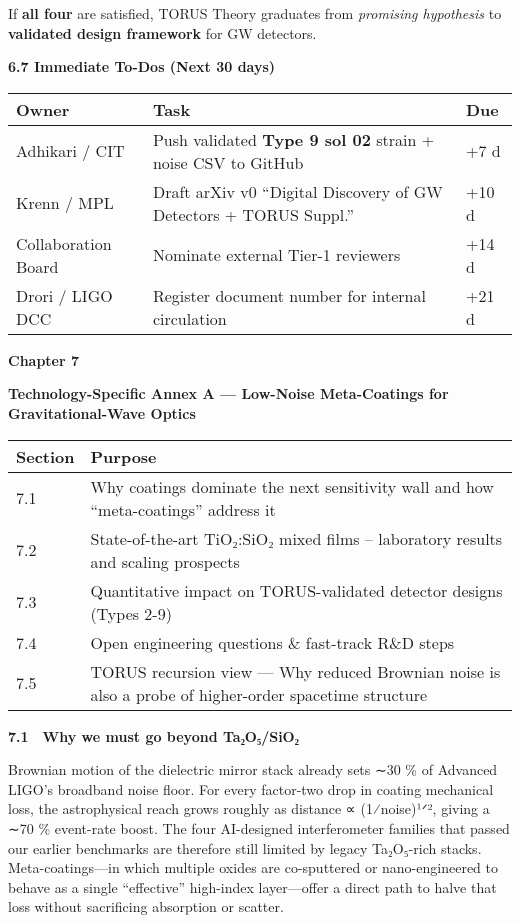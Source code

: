 \documentclass[]{article}
\begin{document}
If \textbf{all four} are satisfied, TORUS Theory graduates from
\emph{promising hypothesis} to \textbf{validated design framework} for
GW detectors.

\textbf{6.7 Immediate To-Dos (Next 30 days)}

\begin{longtable}[]{@{}lll@{}}
\toprule
\textbf{Owner} & \textbf{Task} & \textbf{Due}\tabularnewline
\midrule
\endhead
Adhikari / CIT & Push validated \textbf{Type 9 sol 02} strain + noise
CSV to GitHub & +7 d\tabularnewline
Krenn / MPL & Draft arXiv v0 ``Digital Discovery of GW Detectors + TORUS
Suppl.'' & +10 d\tabularnewline
Collaboration Board & Nominate external Tier-1 reviewers & +14
d\tabularnewline
Drori / LIGO DCC & Register document number for internal circulation &
+21 d\tabularnewline
\bottomrule
\end{longtable}

\textbf{Chapter 7}

\textbf{Technology-Specific Annex A --- Low-Noise Meta-Coatings for
Gravitational-Wave Optics}

\begin{longtable}[]{@{}ll@{}}
\toprule
\textbf{Section} & \textbf{Purpose}\tabularnewline
\midrule
\endhead
7.1 & Why coatings dominate the next sensitivity wall and how
``meta-coatings'' address it\tabularnewline
7.2 & State-of-the-art TiO₂:SiO₂ mixed films -- laboratory results and
scaling prospects\tabularnewline
7.3 & Quantitative impact on TORUS-validated detector designs (Types
2-9)\tabularnewline
7.4 & Open engineering questions \& fast-track R\&D steps\tabularnewline
7.5 & TORUS recursion view --- Why reduced Brownian noise is also a
probe of higher-order spacetime structure\tabularnewline
\bottomrule
\end{longtable}

\textbf{7.1 Why we must go beyond Ta₂O₅/SiO₂}

Brownian motion of the dielectric mirror stack already sets ∼30 \% of
Advanced LIGO's broadband noise floor. For every factor-two drop in
coating mechanical loss, the astrophysical reach grows roughly as
distance ∝ (1⁄noise)¹ᐟ², giving a ∼70 \% event-rate boost. The four
AI-designed interferometer families that passed our earlier benchmarks
are therefore still limited by legacy Ta₂O₅-rich stacks.
Meta-coatings---in which multiple oxides are co-sputtered or
nano-engineered to behave as a single ``effective'' high-index
layer---offer a direct path to halve that loss without sacrificing
absorption or scatter.
\end{document}
